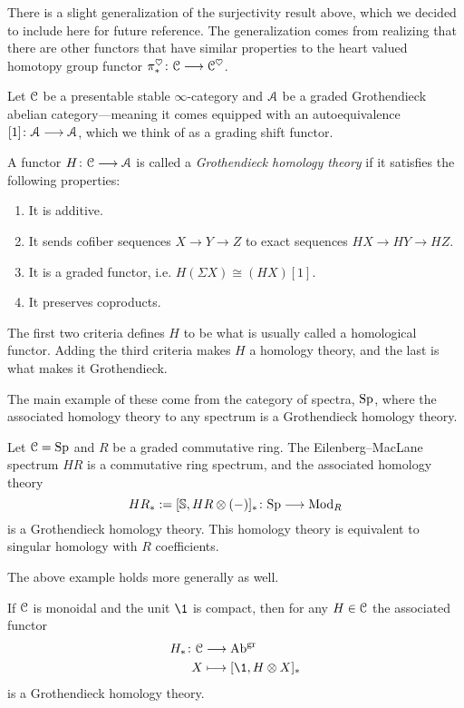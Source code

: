 There is a slight generalization of the surjectivity result above, which we decided to include here for future reference. The generalization comes from realizing that there are other functors that have similar properties to the heart valued homotopy group functor $\pi_*^\heartsuit \colon \EuScript{C}\longrightarrow \EuScript{C}^\heartsuit$. 

Let $\EuScript{C}$ be a presentable stable $\infty$-category and $\EuScript{A}$ be a graded Grothendieck abelian category---meaning it comes equipped with an autoequivalence $[1]\colon \EuScript{A}\longrightarrow \EuScript{A}$, which we think of as a grading shift functor. 

\begin{definition}
    A functor $H\colon \EuScript{C}\longrightarrow \EuScript{A}$ is called a \emph{Grothendieck homology theory} if it satisfies the following properties:
    \begin{enumerate}
        \item It is additive.
        \item It sends cofiber sequences $X\rightarrow Y \rightarrow Z$ to exact sequences $HX\rightarrow HY\rightarrow HZ$.
        \item It is a graded functor, i.e. $H(\Sigma X) \cong (HX)[1]$.
        \item It preserves coproducts. 
    \end{enumerate}
\end{definition}

\begin{remark}
    The first two criteria defines $H$ to be what is usually called a homological functor. Adding the third criteria makes $H$ a homology theory, and the last is what makes it Grothendieck. 
\end{remark}

The main example of these come from the category of spectra, $\mathrm{Sp}$, where the associated homology theory to any spectrum is a Grothendieck homology theory.

\begin{example}
    Let $\EuScript{C}=\mathrm{Sp}$ and $R$ be a graded commutative ring. The Eilenberg--MacLane spectrum $HR$ is a commutative ring spectrum, and the associated homology theory 
    \[HR_* := [\mathbb{S}, HR\otimes (-)]_*\colon \mathrm{Sp} \longrightarrow \mathrm{Mod}_R\] 
    is a Grothendieck homology theory. This homology theory is equivalent to singular homology with $R$ coefficients. 
\end{example}

The above example holds more generally as well. 

\begin{example}
    If $\EuScript{C}$ is monoidal and the unit $\1$ is compact, then for any $H\in \EuScript{C}$ the associated functor
    \begin{align*}
        H_* \: \C &\to \Ab\gr \\
        X &\longmapsto [\1, H\otimes X]_*
    \end{align*}
    is a Grothendieck homology theory. 
\end{example}

